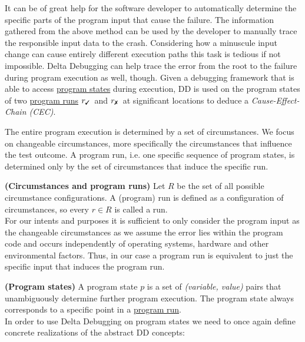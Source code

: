 \documentclass[a4paper,UKenglish]{lipics-v2018}
\newcommand{\cmark}{\text{\ding{51}}}
\newcommand{\xmark}{\text{\ding{55}}}
\newcommand{\defsub}[1]{\textbf{(#1)} }
\newcommand{\rpass}[0]{\ensuremath{r_{\cmark}}}
\newcommand{\rfail}[0]{\ensuremath{r_{\xmark}}}
\begin{document}
It can be of great help for the software developer to automatically determine the specific parts of the program input that cause the failure. The information gathered from the above method can be used by the developer to manually trace the responsible input data to the crash. Considering how a minuscule input change can cause entirely different execution paths this task is tedious if not impossible.
Delta Debugging can help trace the error from the root to the failure during program execution as well, though. Given a debugging framework that is able to access \hyperref[def:program_state]{program states} during execution, DD is used on the program states of two \hyperref[def:program_run]{program runs} \rpass\ and \rfail\ at significant locations to deduce a \textit{Cause-Effect-Chain (CEC)}.

The entire program execution is determined by a set of circumstances. We focus on changeable circumstances, more specifically the circumstances that influence the test outcome. A program run, i.e. one specific sequence of program states, is determined only by the set of circumstances that induce the specific run.

 \label{def:program_run} \defsub{Circumstances and program runs} Let $R$ be the set of all possible circumstance configurations. A (program) run is defined as a configuration of circumstances, so every $r \in R$ is called a run.\\

For our intents and purposes it is sufficient to only consider the program input as the changeable circumstances as we assume the error lies within the program code and occurs independently of operating systems, hardware and other environmental factors. Thus, in our case a program run is equivalent to just the specific input that induces the program run.

 \label{def:program_state} \defsub{Program states} A program state $p$ is a set of \textit{(variable, value)} pairs that unambiguously determine further program execution. The program state always corresponds to a specific point in a \hyperref[def:program_run]{program run}.\\

In order to use Delta Debugging on program states we need to once again define concrete realizations of the abstract DD concepts:
\end{document}

